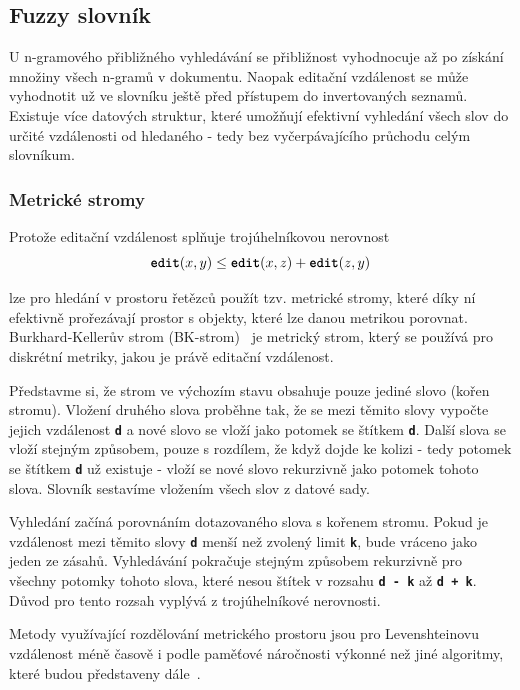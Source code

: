 \documentclass[11pt,letterpaper,oneside,openright]{book}
\newcommand{\bftt}[1]{\texttt{\textbf{#1}}}
\begin{document}
\subsection{Fuzzy slovník}
U n-gramového přibližného vyhledávání se přibližnost vyhodnocuje až po získání
množiny všech n-gramů v dokumentu. Naopak editační vzdálenost se může
vyhodnotit už ve slovníku ještě před přístupem do invertovaných seznamů.
Existuje více datových struktur, které umožňují efektivní vyhledání všech slov
do určité vzdálenosti od hledaného - tedy bez vyčerpávajícího průchodu celým
slovníkum.

\subsubsection{Metrické stromy}
Protože editační vzdálenost splňuje trojúhelníkovou nerovnost
\[\bftt{edit}(x,y) \leq \bftt{edit}(x,z) + \bftt{edit}(z,y)\]

lze pro hledání v prostoru řetězců použít tzv. metrické stromy, které díky ní
efektivně prořezávají prostor s objekty, které lze danou metrikou porovnat.
Burkhard-Kellerův strom (BK-strom)~\cite{Burkhard:1973:ABF:362003.362025} je
metrický strom, který se používá pro diskrétní metriky, jakou je právě editační
vzdálenost.

Představme si, že strom ve výchozím stavu obsahuje pouze jediné slovo (kořen
stromu). Vložení druhého slova proběhne tak, že se mezi těmito slovy vypočte
jejich vzdálenost \bftt{d} a nové slovo se vloží jako potomek se štítkem
\bftt{d}. Další slova se vloží stejným způsobem, pouze s rozdílem, že když
dojde ke kolizi - tedy potomek se štítkem \bftt{d} už existuje - vloží se nové
slovo rekurzivně jako potomek tohoto slova. Slovník sestavíme vložením všech
slov z datové sady.

Vyhledání začíná porovnáním dotazovaného slova s kořenem stromu. Pokud je
vzdálenost mezi těmito slovy \bftt{d} menší než zvolený limit \bftt{k}, bude
vráceno jako jeden ze zásahů. Vyhledávání pokračuje stejným způsobem rekurzivně
pro všechny potomky tohoto slova, které nesou štítek v rozsahu \bftt{d - k} až
\bftt{d + k}. Důvod pro tento rozsah vyplývá z trojúhelníkové nerovnosti.

Metody využívající rozdělování metrického prostoru jsou pro Levenshteinovu
vzdálenost méně časově i podle paměťové náročnosti výkonné než jiné algoritmy,
které budou představeny
dále~\cite{Celikik:2009:FES:1529282.1529669,Boytsov:2011:IMA:1963190.1963191}.
\end{document}
